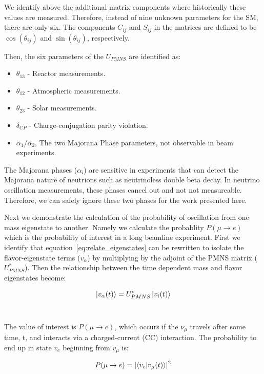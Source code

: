We identify above the additional matrix components where historically these values are measured.
Therefore, instead of nine unknown parameters for the SM, there are only six.
The components $C_{ij}$ and $S_{ij}$ in the matrices are defined to be $\cos(\theta_{ij})$ and $\sin(\theta_{ij})$, respectively.

Then, the six parameters of the $U_{PMNS}$ are identified as:
\begin{itemize}
    \item $\theta_{13}$ - Reactor measurements.
    \item $\theta_{12}$ - Atmospheric measurements.
    \item $\theta_{23}$ - Solar measurements.
    \item $\delta_{CP}$ - Charge-conjugation parity violation.
    \item $\alpha_{1}$/$\alpha_{2}$, The two Majorana Phase parameters, not observable in beam experiments.
\end{itemize}

The Majorana phases ($\alpha_{i}$) are sensitive in experiments that can detect the Majorana nature of neutrions such as neutrinoless double beta decay.
In neutrino oscillation measurements, these phases cancel out and not not measureable.
Therefore, we can safely ignore these two phases for the work presented here.

Next we demonstrate the calculation of the probability of oscillation from one mass eigenstate to another.
Namely we calculate the probablity $P(\mu \rightarrow e)$ which is the probability of interest in a long beamline experiment.
First we identify that equation~\ref{eq:relate_eigenstates} can be rewritten to isolate the flavor-eigenstate terms ($v_{\alpha}$) by multiplying by the adjoint of the PMNS matrix ($U^{*}_{PMNS}$).
Then the relationship between the time dependent mass and flavor eigenstates become:

\begin{equation}
\ket{v_{\alpha}(t)} = U^{*}_{PMNS}\ket{v_{i}(t)}
\end{equation}
~\label{eq:flavor_relation}

The value of interest is $P(\mu \rightarrow e)$, which occurs if the $\nu_{\mu}$ travels after some time, t, and interacts via a charged-current (CC) interaction.
The probability to end up in state $v_{e}$ beginning from $v_{\mu}$ is:

\begin{equation}
P(\mu \rightarrow e) = \lvert \braket{ v_{e} | v_{\mu} (t) }\rvert^{2}
\end{equation}
~\label{eq:prob_calc1}

